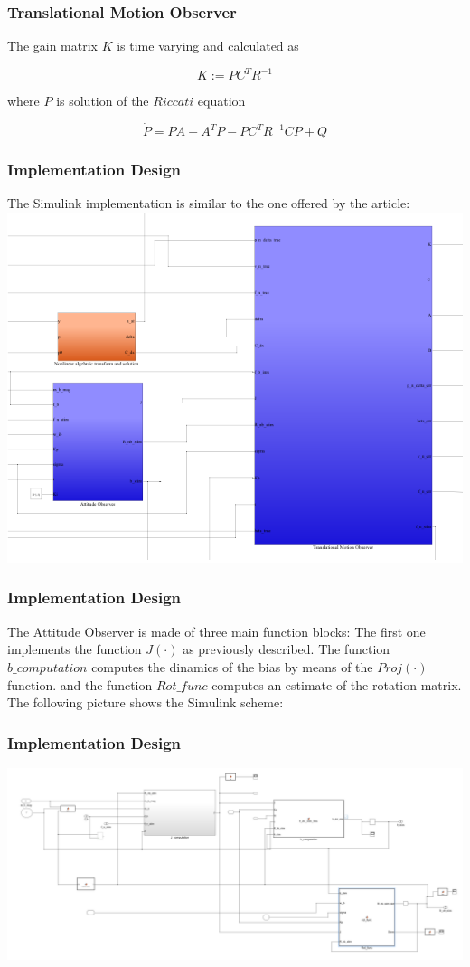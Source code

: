 \documentclass{beamer}
\begin{document}
	\begin{frame}
		\frametitle{Translational Motion Observer}
		The gain matrix $K$ is time varying and calculated as
		
		\[ K := PC^TR^{-1} \]
		
		 where $P$ is solution of the $Riccati$ equation
		
		\[ \dot{P} = PA + A^TP - PC^TR^{-1}CP + Q\]
	\end{frame}
	
	\begin{frame}
		\frametitle{Implementation Design}
		The Simulink implementation is similar to the one offered by the article:
		\includegraphics[scale = 0.4]{scheme}
	\end{frame}
	\begin{frame}
		\frametitle{Implementation Design}
		The Attitude Observer is made of three main function blocks:
		The first one implements the function $J(\cdot) $ as previously described. 
		The function $b\_computation$ computes the dinamics of the bias by means of the $Proj(\cdot)$ function. and the function $Rot\_func$ computes an estimate of the rotation matrix. 
		The following picture shows the Simulink scheme:
		
	\end{frame}
	
	\begin{frame}
		\frametitle{Implementation Design}
		\includegraphics[scale=0.25]{at}
	\end{frame}
\end{document}
